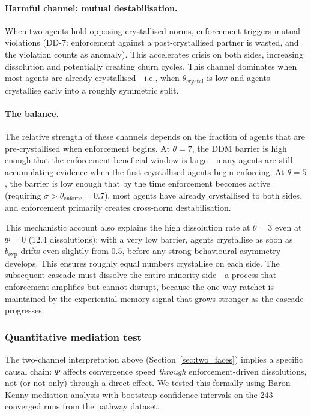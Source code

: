 \documentclass[11pt,a4paper]{article}
\begin{document}
\paragraph{Harmful channel: mutual destabilisation.} When two agents hold opposing crystallised norms, enforcement triggers mutual violations (DD-7: enforcement against a post-crystallised partner is wasted, and the violation counts as anomaly). This accelerates crisis on both sides, increasing dissolution and potentially creating churn cycles. This channel dominates when most agents are already crystallised---i.e., when $\theta_{\mathrm{crystal}}$ is low and agents crystallise early into a roughly symmetric split.

\paragraph{The balance.} The relative strength of these channels depends on the fraction of agents that are pre-crystallised when enforcement begins. At $\theta = 7$, the DDM barrier is high enough that the enforcement-beneficial window is large---many agents are still accumulating evidence when the first crystallised agents begin enforcing. At $\theta = 5$, the barrier is low enough that by the time enforcement becomes active (requiring $\sigma > \theta_{\mathrm{enforce}} = 0.7$), most agents have already crystallised to both sides, and enforcement primarily creates cross-norm destabilisation.

This mechanistic account also explains the high dissolution rate at $\theta = 3$ even at $\Phi = 0$ (12.4 dissolutions): with a very low barrier, agents crystallise as soon as $b_{\exp}$ drifts even slightly from 0.5, before any strong behavioural asymmetry develops. This ensures roughly equal numbers crystallise on each side. The subsequent cascade must dissolve the entire minority side---a process that enforcement amplifies but cannot disrupt, because the one-way ratchet is maintained by the experiential memory signal that grows stronger as the cascade progresses.

\subsubsection{Quantitative mediation test}
\label{sec:mediation}

The two-channel interpretation above (Section~\ref{sec:two_faces}) implies a specific causal chain: $\Phi$ affects convergence speed \emph{through} enforcement-driven dissolutions, not (or not only) through a direct effect. We tested this formally using Baron--Kenny mediation analysis with bootstrap confidence intervals on the 243 converged runs from the pathway dataset.
\end{document}
